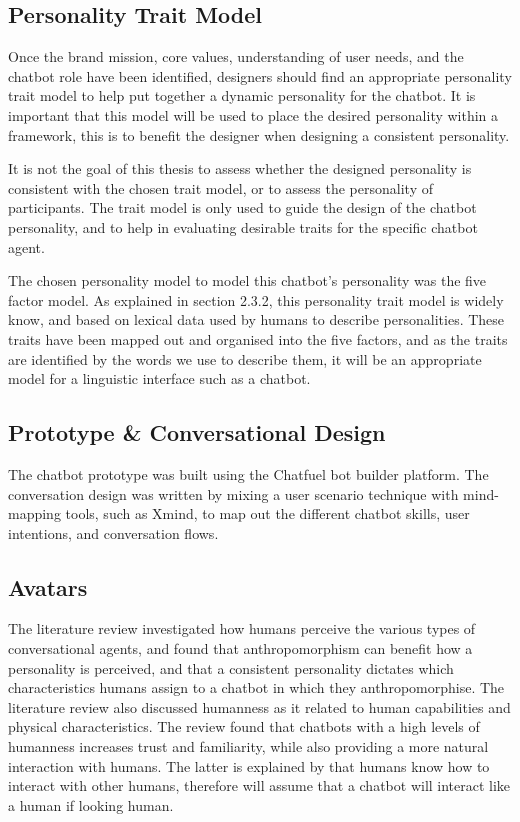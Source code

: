 \vspace{5mm}

    \subsection{Personality Trait Model}
    Once the brand mission, core values, understanding of user needs, and the chatbot role have been identified, designers should find an appropriate personality trait model to help put together a dynamic personality for the chatbot. It is important that this model will be used to place the desired personality within a framework, this is to benefit the designer when designing a consistent personality. 
    
    It is not the goal of this thesis to assess whether the designed personality is consistent with the chosen trait model, or to assess the personality of participants. The trait model is only used to guide the design of the chatbot personality, and to help in evaluating desirable traits for the specific chatbot agent. 
    
    The chosen personality model to model this chatbot's personality was the five factor model. As explained in section 2.3.2, this personality trait model is widely know, and based on lexical data used by humans to describe personalities. These traits have been mapped out and organised into the five factors, and as the traits are identified by the words we use to describe them, it will be an appropriate model for a linguistic interface such as a chatbot.
    
\vspace{5mm}

        \subsection{Prototype \& Conversational Design}
        The chatbot prototype was built using the Chatfuel bot builder platform. The conversation design was written by mixing a user scenario technique with mind-mapping tools, such as Xmind, to map out the different chatbot skills, user intentions, and conversation flows.
        
\vspace{5mm}

        \subsection{Avatars}
        The literature review investigated how humans perceive the various types of conversational agents, and found that anthropomorphism can benefit how a personality is perceived, and that a consistent personality dictates which characteristics humans assign to a chatbot in which they anthropomorphise. The literature review also discussed humanness as it related to human capabilities and physical characteristics. The review found that chatbots with a high levels of humanness increases trust and familiarity, while also providing a more natural interaction with humans. The latter is explained by that humans know how to interact with other humans, therefore will assume that a chatbot will interact like a human if looking human. 
        
